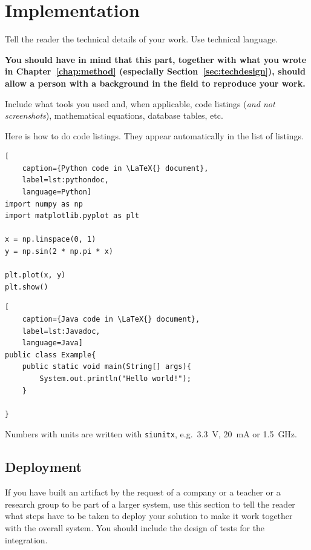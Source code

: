 \chapter{Implementation}
\label{chap:implementation}
\begin{instructions}
Tell the reader the technical details of your work. Use technical language.

\textbf{You should have in mind that this part, together with what you wrote in Chapter~\ref{chap:method} (especially Section~\ref{sec:techdesign}),
should allow a person with a background in the field to reproduce your work.}

Include what tools you used and, when applicable, code listings (\textit{and not screenshots}), mathematical equations, database tables, etc.

Here is how to do code listings. They appear automatically in the list of listings.


\begin{lstlisting}[
    caption={Python code in \LaTeX{} document},
    label=lst:pythondoc,
    language=Python]
import numpy as np
import matplotlib.pyplot as plt

x = np.linspace(0, 1)
y = np.sin(2 * np.pi * x)

plt.plot(x, y)
plt.show()
\end{lstlisting}

\begin{lstlisting}[
    caption={Java code in \LaTeX{} document},
    label=lst:Javadoc,
    language=Java]
public class Example{
    public static void main(String[] args){
        System.out.println("Hello world!");
    }

}
\end{lstlisting}

Numbers with units are written with \texttt{siunitx}, e.g.\ \qty{3.3}{\volt}, \qty{20}{\milli\ampere} or \qty{1.5}{\giga\hertz}.
\end{instructions}

\section{Deployment }
\label{sec:deployment}
\begin{instructions}
If you have built an artifact by the request of a company or a teacher or a research group to be part of a larger system, use this section to tell the reader what steps have to be taken to deploy your solution to make it work together with the overall system. You should include the design of tests for the integration.
\end{instructions}
